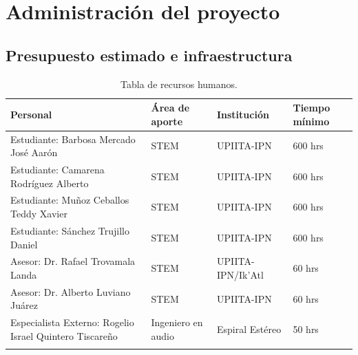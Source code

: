 \documentclass[letterpaper,12pt,oneside]{article}
\begin{document}





 












%


\section*{Administración del proyecto}
\subsection*{Presupuesto estimado e infraestructura}
\begin{center}
\footnotesize
    \begin{longtable}[!htb]{| m{15em} | m{6em} | m{6em}| m{6em}|}
    \hline
    \textbf{Personal}& \textbf{\'Area de aporte} & \textbf{Instituci\'on} & \textbf{Tiempo m\'inimo}\\
    \hline\hline
    Estudiante: Barbosa Mercado José Aarón & STEM & UPIITA-IPN & 600 hrs\\
    \hline
    Estudiante: Camarena Rodríguez Alberto & STEM & UPIITA-IPN & 600 hrs\\
    \hline
    Estudiante: Muñoz Ceballos Teddy Xavier & STEM & UPIITA-IPN & 600 hrs\\
    \hline
    Estudiante: Sánchez Trujillo Daniel & STEM & UPIITA-IPN & 600 hrs\\
    \hline
    Asesor: Dr. Rafael Trovamala Landa & STEM & UPIITA-IPN/Ik'Atl & 60 hrs\\
    \hline
    Asesor: Dr. Alberto Luviano Juárez & STEM & UPIITA-IPN & 60 hrs\\
    \hline
    Especialista Externo: Rogelio Israel Quintero Tiscareño & Ingeniero en audio & Espiral Est\'ereo & 50 hrs\\
    \hline

    \caption{Tabla de recursos humanos.}
    \label{tab:RH}
    \end{longtable}
\end{center}
\end{document}
